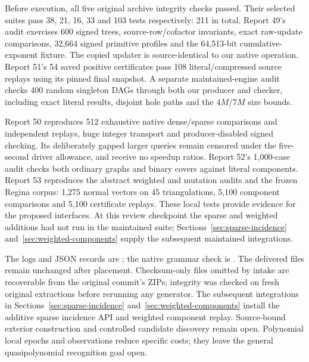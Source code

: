 Before execution, all five original archive integrity checks passed. Their
selected suites pass 38, 21, 16, 33 and 103 tests respectively: 211 in total.
Report 49's audit exercises 600 signed trees, source-row/cofactor invariants,
exact raw-update comparisons, 32,664 signed primitive profiles and the
64,513-bit cumulative-exponent fixture. The copied updater is source-identical
to our native operation. Report 51's 54 saved positive certificates pass
108 literal/compressed source replays using its pinned final snapshot.
A separate maintained-engine audit checks 400 random singleton DAGs through
both our producer and checker, including exact literal results, disjoint hole
paths and the $4M/7M$ size bounds.

Report 50 reproduces 512 exhaustive native dense/sparse comparisons and
independent replays, huge integer transport and producer-disabled signed
checking. Its deliberately gapped larger queries remain censored under the
five-second driver allowance, and receive no speedup ratios. Report 52's
1,000-case audit checks both ordinary graphs and binary covers against
literal components. Report 53 reproduces the abstract weighted and mutation
audits and the frozen Regina corpus: 1,275 normal vectors on 45 triangulations,
5,100 component comparisons and 5,100 certificate replays. These local tests
provide evidence for the proposed interfaces. At this review checkpoint the
sparse and weighted additions had not run in the maintained suite;
Sections~\ref{sec:sparse-incidence} and~\ref{sec:weighted-components} supply
the subsequent maintained integrations.

The logs and JSON records are ; the native grammar
check is .
The delivered files remain unchanged after placement. Checksum-only files
omitted by intake are recoverable from the original commit's ZIPs; integrity
was checked on fresh original extractions before rerunning any generator.
The subsequent integrations in Sections~\ref{sec:sparse-incidence}
and~\ref{sec:weighted-components} install the additive sparse incidence API
and weighted component replay. Source-bound exterior construction and
controlled candidate discovery remain open. Polynomial local epochs and observations reduce specific
costs; they leave the general quasipolynomial recognition goal open.
